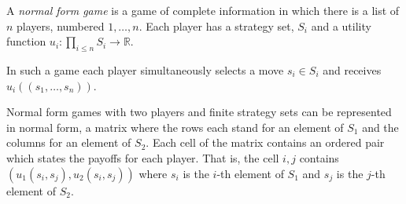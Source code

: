 \documentclass[12pt]{article}
\begin{document}
A \emph{normal form game} is a game of complete information in which there is a list of $n$ players, numbered $1,\ldots,n$.  Each player has a strategy set, $S_i$ and a utility function $u_i:\prod_{i\leq n} S_i\rightarrow \mathbb{R}$.

In such a game each player simultaneously selects a move $s_i\in S_i$ and receives $u_i((s_1,\ldots,s_n))$.

Normal form games with two players and finite strategy sets can be represented in normal form, a matrix where the rows each stand for an element of $S_1$ and the columns for an element of $S_2$.  Each cell of the matrix contains an ordered pair which states the payoffs for each player.  That is, the cell $i,j$ contains $(u_1(s_i,s_j),u_2(s_i,s_j))$ where $s_i$ is the $i$-th element of $S_1$ and $s_j$ is the $j$-th element of $S_2$.
\end{document}
